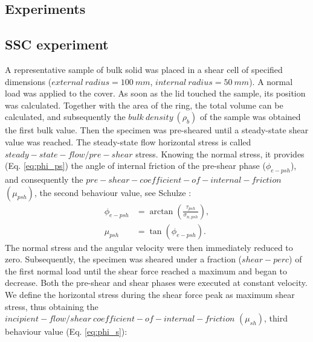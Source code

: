 \documentclass[review]{elsarticle}
\begin{document}
\begin{appendix}
\section{Experiments}
\label{sec:appexperiments}

\subsection{SSC experiment}
\label{subsec:srsctexperiment}
A representative sample of bulk solid was placed in a shear cell of specified
dimensions ($external ~ radius = 100 ~ mm$, $internal ~ radius = 50 ~ mm$).
A normal load was applied to the cover. As soon as the lid touched the sample,
its position was calculated.
Together with the area of the ring, the total volume can be calculated, and subsequently the $bulk ~ density ~ (\rho_b)$ 
of the sample was obtained the first bulk value.
Then the specimen was pre-sheared until a steady-state shear value was reached.
The steady-state flow horizontal stress
is called $steady-state-flow/pre-shear$ stress.
Knowing the normal stress, it provides (Eq. \ref{eq:phi_ps}) the angle of
internal friction of the pre-shear phase ($\phi_{e-psh}$), and consequently the
$pre-shear-coefficient-of-internal-friction $ $ (\mu_{psh})$, the second
behaviour value, see Schulze \cite{RefWorks:118}:
\begin{equation}
\begin{aligned}
\phi_{e-psh} &= \arctan \left(\frac{\tau_{psh}}{\sigma_{n,psh}} \right) ,\\
\mu_{psh} &=\tan(\phi_{e-psh}) .
\end{aligned}
 \label{eq:phi_ps}
\end{equation}
The normal stress and the angular velocity were then immediately reduced to zero. 
Subsequently, the specimen was sheared under a fraction ($shear-perc$) of the first normal load until the shear force 
reached a maximum and began to decrease. 
Both the pre-shear and shear phases were executed at constant velocity. 
We define the horizontal stress during the shear force peak as maximum shear stress, 
thus obtaining the $incipient-flow/shear ~ coefficient-of-internal-friction $ $
(\mu_{sh})$, third behaviour value (Eq. \ref{eq:phi_s})\cite{RefWorks:118}:
\begin{equation}
\begin{aligned}

\end{aligned}
\end{equation}
\end{appendix}
\end{document}
